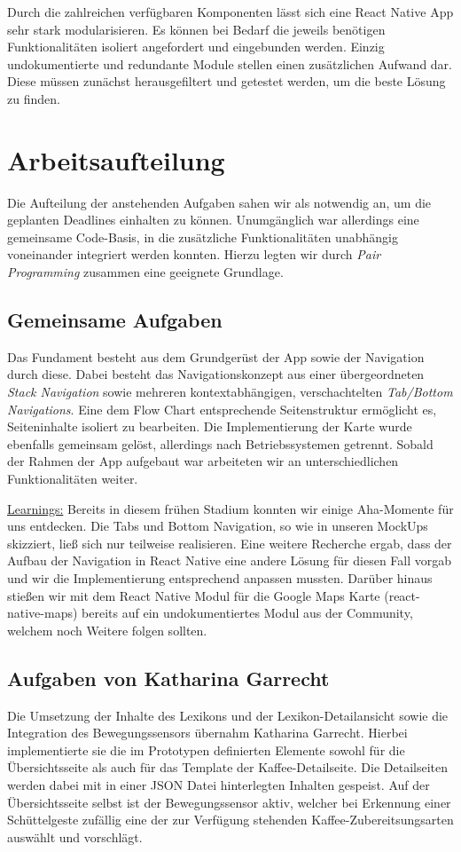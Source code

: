 Durch die zahlreichen verfügbaren Komponenten lässt sich eine React Native App sehr stark modularisieren.
Es können bei Bedarf die jeweils benötigen Funktionalitäten isoliert angefordert und eingebunden werden.
Einzig undokumentierte und redundante Module stellen einen zusätzlichen Aufwand dar.
Diese müssen zunächst herausgefiltert und getestet werden, um die beste Lösung zu finden.

\section{Arbeitsaufteilung}
Die Aufteilung der anstehenden Aufgaben sahen wir als notwendig an, um die geplanten Deadlines einhalten zu können.
Unumgänglich war allerdings eine gemeinsame Code-Basis, in die zusätzliche Funktionalitäten unabhängig voneinander integriert werden konnten.
Hierzu legten wir durch \emph{Pair Programming} zusammen eine geeignete Grundlage.

\subsection{Gemeinsame Aufgaben}
Das Fundament besteht aus dem Grundgerüst der App sowie der Navigation durch diese.
Dabei besteht das Navigationskonzept aus einer übergeordneten \emph{Stack Navigation} sowie mehreren kontextabhängigen, verschachtelten \emph{Tab/Bottom Navigations}.
Eine dem Flow Chart entsprechende Seitenstruktur ermöglicht es, Seiteninhalte isoliert zu bearbeiten.
Die Implementierung der Karte wurde ebenfalls gemeinsam gelöst, allerdings nach Betriebssystemen getrennt.
Sobald der Rahmen der App aufgebaut war arbeiteten wir an unterschiedlichen Funktionalitäten weiter.

\underline{Learnings:}
Bereits in diesem frühen Stadium konnten wir einige Aha-Momente für uns entdecken.
Die Tabs und Bottom Navigation, so wie in unseren MockUps skizziert, ließ sich nur teilweise realisieren.
Eine weitere Recherche ergab, dass der Aufbau der Navigation in React Native eine andere Lösung für diesen Fall vorgab und wir die Implementierung entsprechend anpassen mussten.
Darüber hinaus stießen wir mit dem React Native Modul für die Google Maps Karte (react-native-maps) bereits auf ein undokumentiertes Modul aus der Community, welchem noch Weitere folgen sollten.

\subsection{Aufgaben von Katharina Garrecht}
Die Umsetzung der Inhalte des Lexikons und der Lexikon-Detailansicht sowie die Integration des Bewegungssensors übernahm Katharina Garrecht.
Hierbei implementierte sie die im Prototypen definierten Elemente sowohl für die Übersichtsseite als auch für das Template der Kaffee-Detailseite.
Die Detailseiten werden dabei mit in einer JSON Datei hinterlegten Inhalten gespeist.
Auf der Übersichtsseite selbst ist der Bewegungssensor aktiv, welcher bei Erkennung einer Schüttelgeste zufällig eine der zur Verfügung stehenden Kaffee-Zubereitsungsarten auswählt und vorschlägt.

